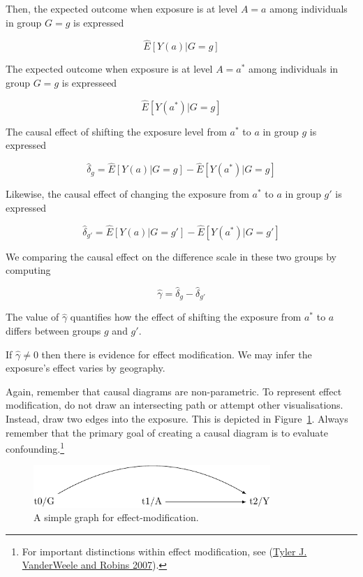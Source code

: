 \documentclass[
  singlecolumn]{report}
\begin{document}
Then, the expected outcome when exposure is at level \(A=a\) among
individuals in group \(G=g\) is expressed

\[\hat{E}[Y(a)|G=g]\]

The expected outcome when exposure is at level \(A=a^*\) among
individuals in group \(G=g\) is expresseed

\[\hat{E}[Y(a^*)|G=g]\]

The causal effect of shifting the exposure level from \(a^*\) to \(a\)
in group \(g\) is expressed

\[\hat{\delta}_g = \hat{E}[Y(a)|G=g] - \hat{E}[Y(a^*)|G=g]\]

Likewise, the causal effect of changing the exposure from \(a^*\) to
\(a\) in group \(g'\) is expressed

\[\hat{\delta}_{g'} = \hat{E}[Y(a)|G=g'] - \hat{E}[Y(a^*)|G=g']\]

We comparing the causal effect on the difference scale in these two
groups by computing

\[\hat{\gamma} = \hat{\delta}_g - \hat{\delta}_{g'}\]

The value of \(\hat{\gamma}\) quantifies how the effect of shifting the
exposure from \(a^*\) to \(a\) differs between groups \(g\) and \(g'\).

If \(\hat{\gamma}\neq 0\) then there is evidence for effect
modification. We may infer the exposure's effect varies by geography.

Again, remember that causal diagrams are non-parametric. To represent
effect modification, do not draw an intersecting path or attempt other
visualisations. Instead, draw two edges into the exposure. This is
depicted in Figure~\ref{fig-dag-effect-modfication}. Always remember
that the primary goal of creating a causal diagram is to evaluate
confounding.\footnote{For important distinctions within effect
  modification, see (\protect\hyperlink{ref-vanderweele2007}{Tyler J.
  VanderWeele and Robins 2007}).}

\begin{figure}

{\centering \includegraphics[width=0.8\textwidth,height=\textheight]{causal-dags_files/figure-pdf/fig-dag-effect-modfication-1.pdf}

}

\caption{\label{fig-dag-effect-modfication}A simple graph for
effect-modification.}

\end{figure}
\end{document}
